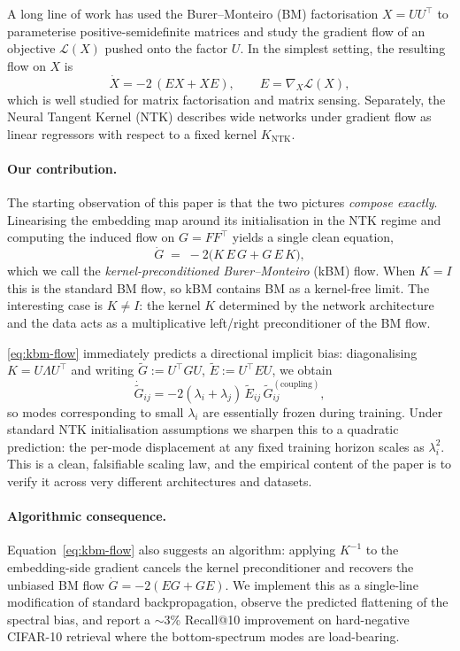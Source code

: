 \documentclass[11pt]{article}
\theoremstyle{definition}
\theoremstyle{plain}
\begin{document}
A long line of work has used the Burer--Monteiro (BM) factorisation
$X=UU^\top$ to parameterise positive-semidefinite matrices and study the
gradient flow of an objective $\mathcal{L}(X)$ pushed onto the factor $U$. In
the simplest setting, the resulting flow on $X$ is
\[
   \dot X = -2\,(E X + X E),\qquad E=\nabla_X\mathcal{L}(X),
\]
which is well studied for matrix factorisation and matrix sensing. Separately,
the Neural Tangent Kernel (NTK) describes wide networks under gradient flow as
linear regressors with respect to a fixed kernel $K_{\mathrm{NTK}}$.

\paragraph{Our contribution.}
The starting observation of this paper is that the two pictures \emph{compose
exactly}. Linearising the embedding map around its initialisation in the NTK
regime and computing the induced flow on $G=FF^\top$ yields a single clean
equation,
\begin{equation}
\label{eq:kbm-flow}
\dot G \;=\; -2\bigl(K\,E\,G + G\,E\,K\bigr),
\end{equation}
which we call the \emph{kernel-preconditioned Burer--Monteiro} (kBM) flow.
When $K=I$ this is the standard BM flow, so kBM contains BM as a kernel-free
limit. The interesting case is $K\ne I$: the kernel $K$ determined by the
network architecture and the data acts as a multiplicative left/right
preconditioner of the BM flow.

\eqref{eq:kbm-flow} immediately predicts a directional implicit bias:
diagonalising $K=U\Lambda U^\top$ and writing $\widetilde G:=U^\top G U$,
$\widetilde E:=U^\top E U$, we obtain
\[
   \dot{\widetilde G}_{ij} = -2(\lambda_i+\lambda_j)\,\widetilde E_{ij}\,\widetilde G_{ij}^{(\text{coupling})},
\]
so modes corresponding to small $\lambda_i$ are essentially frozen during
training. Under standard NTK initialisation assumptions we sharpen this to a
quadratic prediction: the per-mode displacement at any fixed training horizon
scales as $\lambda_i^2$. This is a clean, falsifiable scaling law, and the
empirical content of the paper is to verify it across very different
architectures and datasets.

\paragraph{Algorithmic consequence.}
Equation~\eqref{eq:kbm-flow} also suggests an algorithm: applying $K^{-1}$ to
the embedding-side gradient cancels the kernel preconditioner and recovers the
unbiased BM flow $\dot G=-2(EG+GE)$. We implement this as a single-line
modification of standard backpropagation, observe the predicted flattening of
the spectral bias, and report a $\sim$$3$\% Recall@10 improvement on
hard-negative CIFAR-10 retrieval where the bottom-spectrum modes are
load-bearing.
\end{document}
